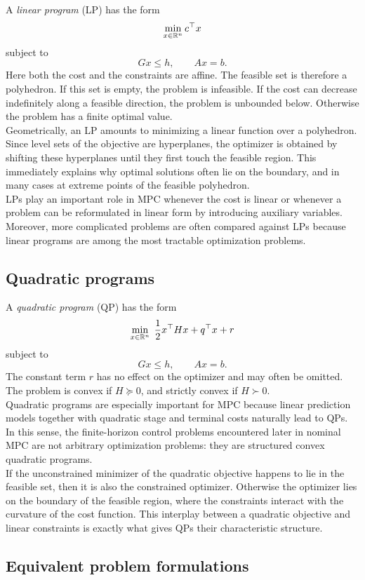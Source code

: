 A \emph{linear program} (LP) has the form
\[
\min_{x\in\mathbb{R}^n} c^\top x
\]
subject to
\[
Gx\le h,\qquad Ax=b.
\]
Here both the cost and the constraints are affine. The feasible set is therefore a polyhedron. If this set is empty, the problem is infeasible. If the cost can decrease indefinitely along a feasible direction, the problem is unbounded below. Otherwise the problem has a finite optimal value.\\
Geometrically, an LP amounts to minimizing a linear function over a polyhedron. Since level sets of the objective are hyperplanes, the optimizer is obtained by shifting these hyperplanes until they first touch the feasible region. This immediately explains why optimal solutions often lie on the boundary, and in many cases at extreme points of the feasible polyhedron.\\
LPs play an important role in MPC whenever the cost is linear or whenever a problem can be reformulated in linear form by introducing auxiliary variables. Moreover, more complicated problems are often compared against LPs because linear programs are among the most tractable optimization problems.

\subsection{Quadratic programs}

A \emph{quadratic program} (QP) has the form
\[
\min_{x\in\mathbb{R}^n}\; \frac12 x^\top Hx + q^\top x + r
\]
subject to
\[
Gx\le h,\qquad Ax=b.
\]
The constant term \(r\) has no effect on the optimizer and may often be omitted. The problem is convex if \(H\succeq 0\), and strictly convex if \(H\succ 0\).\\
Quadratic programs are especially important for MPC because linear prediction models together with quadratic stage and terminal costs naturally lead to QPs. In this sense, the finite-horizon control problems encountered later in nominal MPC are not arbitrary optimization problems: they are structured convex quadratic programs.\\
If the unconstrained minimizer of the quadratic objective happens to lie in the feasible set, then it is also the constrained optimizer. Otherwise the optimizer lies on the boundary of the feasible region, where the constraints interact with the curvature of the cost function. This interplay between a quadratic objective and linear constraints is exactly what gives QPs their characteristic structure.

\subsection{Equivalent problem formulations}

